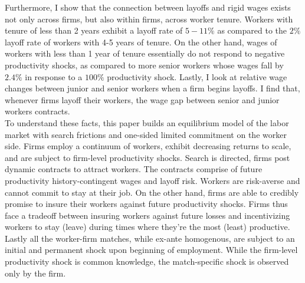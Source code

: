 Furthermore, I show that the connection between layoffs and rigid wages exists not only across firms, but also within firms, across worker tenure. Workers with tenure of less than 2 years exhibit a layoff rate of $5-11\%$ as compared to the $2\%$ layoff rate of workers with 4-5 years of tenure. On the other hand, wages of workers with less than 1 year of tenure essentially do not respond to negative productivity shocks, as compared to more senior workers whose wages fall by $2.4\%$ in response to a $100\%$ productivity shock.
Lastly, I look at relative wage changes between junior and senior workers when a firm begins layoffs. I find that, whenever firms layoff their workers, the wage gap between senior and junior workers contracts. \\
To understand these facts, this paper builds an equilibrium model of the labor market with search frictions and one-sided limited commitment on the worker side. Firms employ a continuum of workers, exhibit decreasing returns to scale, and are subject to firm-level productivity shocks. Search is directed, firms post dynamic contracts to attract workers. The contracts comprise of future productivity history-contingent wages and layoff risk. Workers are risk-averse and cannot commit to stay at their job. On the other hand, firms are able to credibly promise to insure their workers against future productivity shocks. Firms thus face a tradeoff between insuring workers against future losses and incentivizing workers to stay (leave) during times where they're the most (least) productive. Lastly all the worker-firm matches, while ex-ante homogenous, are subject to an initial and permanent shock upon beginning of employment. While the firm-level productivity shock is common knowledge, the match-specific shock is observed only by the firm. \\
